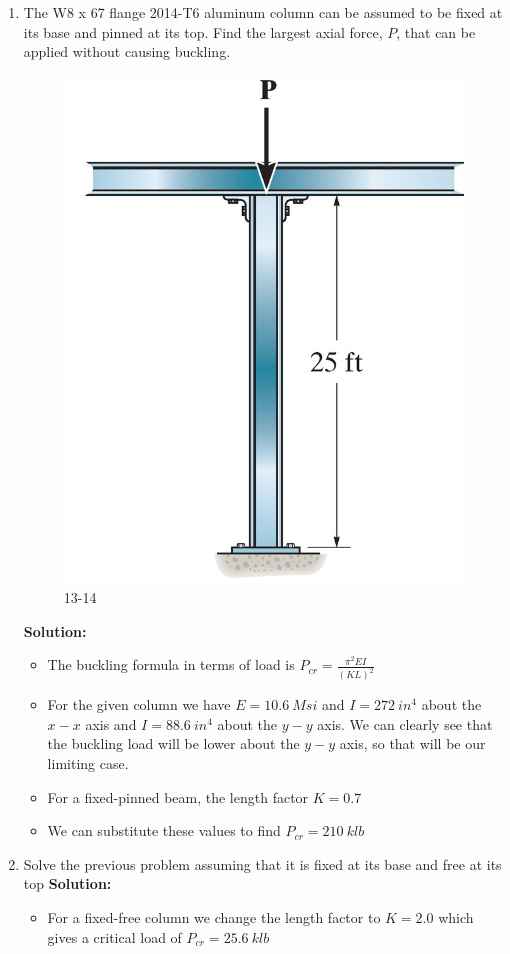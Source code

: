 \documentclass[12pt, oneside]{article}
\let\US\SI
\begin{document}
\begin{enumerate}
	\item %
		The W8 x 67 flange 2014-T6 aluminum column can be assumed to be fixed at its base and pinned at its top.
		Find the largest axial force, $P$, that can be applied without causing buckling.
		\begin{figure}[H]
			\centering
			\includegraphics[width=0.6\linewidth]{13-14}
			\caption{13-14}%
			\label{fig:13-14}
		\end{figure}
			\textbf{Solution:}
			\begin{itemize}
				\item The buckling formula in terms of load is $P_{cr} = \frac{\pi^2 EI}{(KL)^2}$
				\item For the given column we have $E = 	\US{10.6}{Msi} $ and $I = 	\US{272}{in^4} $ about the $x-x$ axis and $I = 	\US{88.6}{in^4} $ about the $y-y$ axis. We can clearly see that the buckling load will be lower about the $y-y$ axis, so that will be our limiting case.
				\item For a fixed-pinned beam, the length factor $K = 0.7$
				\item We can substitute these values to find $P_{cr} = 	\US{210}{klb} $ 
			\end{itemize}

	\item %
		Solve the previous problem assuming that it is fixed at its base and free at its top
			\textbf{Solution:}
			\begin{itemize}
				\item For a fixed-free column we change the length factor to $K = 2.0$ which gives a critical load of $P_{cr} = 	\US{25.6}{klb} $
			\end{itemize}


\end{enumerate}
\end{document}

